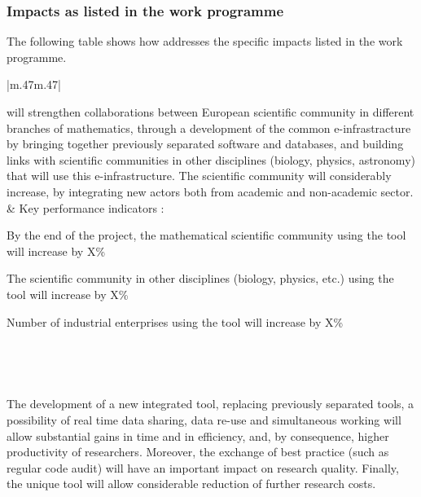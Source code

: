\subsubsection{Impacts as listed in the work programme}

The following table shows how \TheProject  addresses the specific impacts
listed in the work programme.



\begin{supertabular}{|m{.47\textwidth}m{.47\textwidth}|}\hline\hline
{}\\\hline

  \TheProject will strengthen collaborations between European scientific community in
  different branches of mathematics, through a development of the common e-infrastracture
  by bringing together previously separated software and databases, and building links with
  scientific communities in other disciplines (biology, physics, astronomy) that will use
  this e-infrastructure. The scientific community will considerably increase, by
  integrating new actors both from academic and non-academic sector. 
& Key performance indicators :
  \begin{compactenum}
  \item By the end of the project, the mathematical scientific community using the tool
    will increase by X\%
  \item The scientific community in other disciplines (biology, physics, etc.) using the tool
    will increase by X\%
  \item Number of industrial enterprises using the tool will increase by X\%
  \end{compactenum} \\\hline

  \hline{}\\\hline

  The development of a new integrated tool, replacing %
    previously separated tools, a possibility of real time data sharing, data re-use and
    simultaneous working will allow substantial gains in time and in efficiency, and, by
    consequence, higher productivity of researchers. Moreover, the exchange of best
    practice (such as regular code audit) will have an important impact on research
    quality. Finally, the unique tool will allow considerable reduction of further 
    research costs.


\end{supertabular}
